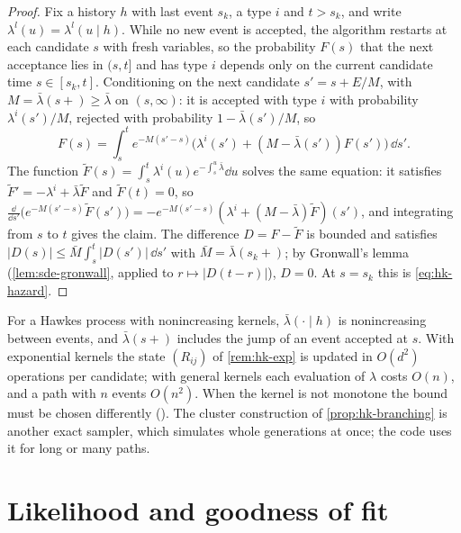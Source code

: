 \begin{proof}
Fix a history $h$ with last event $s_k$, a type $i$ and $t>s_k$, and write $\lambda^l(u)=\lambda^l(u\mid h)$. While no
new event is accepted, the algorithm restarts at each candidate $s$ with fresh variables, so the probability
$F(s)$ that the next acceptance lies in $(s,t]$ and has type $i$ depends only on the current candidate time
$s\in[s_k,t]$. Conditioning on the next candidate $s'=s+E/M$, with $M=\bar\lambda(s+)\ge\bar\lambda$ on $(s,\infty)$:
it is accepted with type $i$ with probability $\lambda^i(s')/M$, rejected with probability $1-\bar\lambda(s')/M$, so
\[
  F(s)=\int_s^te^{-M(s'-s)}\big(\lambda^i(s')+(M-\bar\lambda(s'))F(s')\big)\,\dd s' .
\]
The function $\tilde F(s)=\int_s^t\lambda^i(u)e^{-\int_s^u\bar\lambda}\dd u$ solves the same equation: it satisfies
$\tilde F'=-\lambda^i+\bar\lambda\tilde F$ and $\tilde F(t)=0$, so $\frac{\dd}{\dd s'}\big(e^{-M(s'-s)}\tilde F(s')\big)
=-e^{-M(s'-s)}(\lambda^i+(M-\bar\lambda)\tilde F)(s')$, and integrating from $s$ to $t$ gives the claim. The difference
$D=F-\tilde F$ is bounded and satisfies $|D(s)|\le\bar M\int_s^t|D(s')|\,\dd s'$ with $\bar M=\bar\lambda(s_k+)$; by
Gronwall's lemma (\cref{lem:sde-gronwall}, applied to $r\mapsto|D(t-r)|$), $D=0$. At $s=s_k$ this is
\eqref{eq:hk-hazard}.
\end{proof}

For a Hawkes process with nonincreasing kernels, $\bar\lambda(\cdot\mid h)$ is nonincreasing between events, and
$\bar\lambda(s+)$ includes the jump of an event accepted at $s$. With exponential kernels the state
$(R_{ij})$ of \cref{rem:hk-exp} is updated in $O(d^2)$ operations per candidate; with general kernels each
evaluation of $\lambda$ costs $O(n)$, and a path with $n$ events $O(n^2)$. When the kernel is not monotone the
bound must be chosen differently (). The cluster construction of \cref{prop:hk-branching} is another
exact sampler, which simulates whole generations at once; the code uses it for long or many paths.


\section{Likelihood and goodness of fit}\label{sec:hk-estimation}

